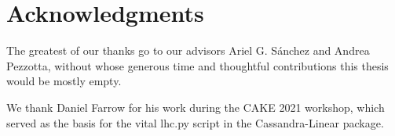

\chapter*{Acknowledgments}

The greatest of our thanks go to our advisors Ariel G. S\'{a}nchez and Andrea
Pezzotta, without whose generous time and thoughtful contributions this thesis
would be mostly empty.

We thank Daniel Farrow for his work during the CAKE 2021 workshop, which
served as the basis for the vital lhc.py script in the Cassandra-Linear
package.
